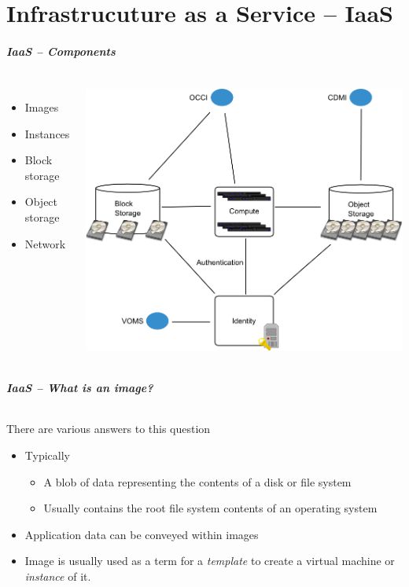 \part{Infrastrucuture as a Service -- IaaS}

\begin{frame}
\frametitle{IaaS -- Components}
\begin{columns}
\begin{itemize}
\item Images
\item Instances
\item Block storage
\item Object storage
\item Network
\end{itemize}
\includegraphics[width=\textwidth]{images/IaaS_OCCI.png}
\end{columns}
\end{frame}

\begin{frame}
\frametitle{IaaS -- What is an image?}
\framesubtitle{}
There are various answers to this question
\begin{itemize}
\item Typically
  \begin{itemize}
  \item A blob of data representing the contents of a disk or file system
  \item Usually contains the root file system contents of an operating system
  \end{itemize}
\item Application data can be conveyed within images
\item Image is usually used as a term for a \emph{template} to create
  a virtual machine or \emph{instance} of it.
\end{itemize}
\end{frame}

